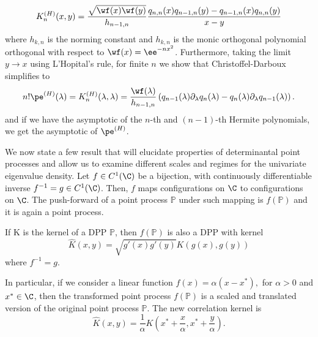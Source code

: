 \begin{exemplo}
\begin{equation}
		K^{(H)}_n(x,y) = \frac{\sqrt{\wf(x) \wf(y)}}{h_{n-1, n}} \frac{q_{n, n}(x)q_{n-1, n}(y) - q_{n-1,n}(x)q_{n,n}(y)}{x-y}
	\end{equation}
	where  $h_{k,n}$ is the norming constant and $h_{k, n}$ is the monic orthogonal polynomial orthogonal with respect to $\wf(x) = \ee^{-nx^2}$. Furthermore, taking the limit $y \rightarrow x$ using L'Hopital's rule, for finite $n$ we show that Christoffel-Darboux simplifies to
	\begin{equation}
 		n! \pe^{(H)}(\lambda) =	K^{(H)}_n(\lambda, \lambda) = \frac{\wf(\lambda)}{h_{n-1, n}} \left( q_{n-1}(\lambda)\partial_\lambda q_{n}(\lambda) - q_{n}(\lambda)\partial_\lambda q_{n-1}(\lambda)  \right).
 	\end{equation}
 	and if we have the asymptotic of the $n$-th and $(n-1)$-th Hermite polynomials, we get the asymptotic of $\pe^{(H)}$.
\end{exemplo}


We now state a few result that will elucidate properties of determinantal point processes and allow us to examine different scales and regimes for the univariate eigenvalue density. Let $f \in C^1(\C)$ be a bijection, with continuously differentiable inverse $f^{-1} = g \in C^1(\C)$. Then, $f$ maps configurations on $\C$ to configurations on $\C$. The push-forward of a point process $\mathbb{P}$ under such mapping is $f(\mathbb{P})$ and it is again a point process.
 
 \begin{proposicao}	\label{Proposition: Scaling Kernel}
 	\cite{ManuelaGirottiPhD}
 	If K is the kernel of a DPP $\mathbb{P}$, then $f(\mathbb{P})$ is also a DPP with kernel
 	\begin{equation}
 		\hat{K}(x, y) = \sqrt{g'(x) g'(y)} K(g(x), g(y))
 	\end{equation}
 	where $f^{-1} = g$.
 \end{proposicao}
 
 In particular, if we consider a linear function $f(x) = \alpha (x - x^*),$ for $\alpha > 0$ and $x^* \in \C$, then the transformed point process $f(\mathbb{P})$ is a scaled and translated version of the original point process $\mathbb{P}$. The new correlation kernel is
 \begin{equation}
 	\hat{K}(x, y) = \frac{1}{\alpha} K\left(x^* + \frac{x}{\alpha}, x^* + \frac{y}{\alpha}\right).
 \end{equation}
 

